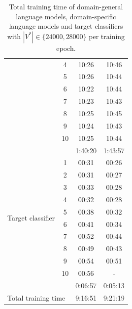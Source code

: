 \begin{table}[ht]
\begin{tabular}{ lccc }
                                                 & 4                      & 10:26            & 10:46            \\
                                                 & 5                      & 10:26            & 10:44            \\
                                                 & 6                      & 10:22            & 10:44            \\
                                                 & 7                      & 10:23            & 10:43            \\
                                                 & 8                      & 10:25            & 10:45            \\
                                                 & 9                      & 10:24            & 10:43            \\
                                                 & 10                     & 10:25            & 10:44            \\ \midrule
& & 1:40:20 & 1:43:57\\ \midrule
\multirow{10}{*}{Target classifier}              & 1                      & 00:31            & 00:26            \\
                                                 & 2                      & 00:31            & 00:27            \\
                                                 & 3                      & 00:33            & 00:28            \\
                                                 & 4                      & 00:32            & 00:28            \\
                                                 & 5                      & 00:38            & 00:32            \\
                                                 & 6                      & 00:41            & 00:34            \\
                                                 & 7                      & 00:52            & 00:44            \\
                                                 & 8                      & 00:49            & 00:43            \\
                                                 & 9                      & 00:54            & 00:51            \\
                                                 & 10                     & 00:56            & -\\ \midrule
& & 0:06:57 & 0:05:13 \\ \toprule
\multicolumn{2}{l}{Total training time} & 9:16:51 & 9:21:19 \\
\bottomrule
\end{tabular}
\caption{Total training time of domain-general language models, domain-specific language models and target classifiers with $|V^*| \in \{24000, 28000\}$ per training epoch.}
\end{table}

